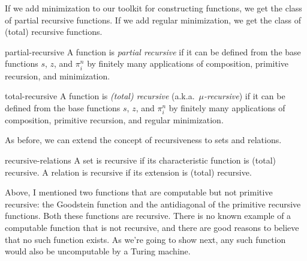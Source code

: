 If we add minimization to our toolkit for constructing functions,
we get the class of partial recursive functions.
If we add regular minimization,
we get the class of (total) recursive functions.

\begin{definition}{}{partial-recursive}
  A function is \emph{partial recursive} if
  it can be defined from the base functions $s$, $z$, and $\pi^{n}_{i}$ by finitely many applications of composition, primitive recursion, and minimization.
\end{definition}

\begin{definition}{}{total-recursive}
  A function is \emph{(total) recursive} (a.k.a.\ \emph{$\mu$-recursive}) if
  it can be defined from the base functions $s$, $z$, and $\pi^{n}_{i}$ by finitely many applications of composition, primitive recursion, and regular minimization.
\end{definition}


As before,
we can extend the concept of recursiveness to sets and relations.

\begin{definition}{}{recursive-relations}
  A set is recursive if its characteristic function is (total) recursive.
  A relation is recursive if its extension is (total) recursive.
\end{definition}

Above,
I mentioned two functions that are computable but not primitive recursive:
the Goodstein function and the antidiagonal of the primitive recursive functions.
Both these functions are recursive.
There is no known example of a computable function that is not recursive,
and there are good reasons to believe that no such function exists.
As we're going to show next,
any such function would also be uncomputable by a Turing machine.




